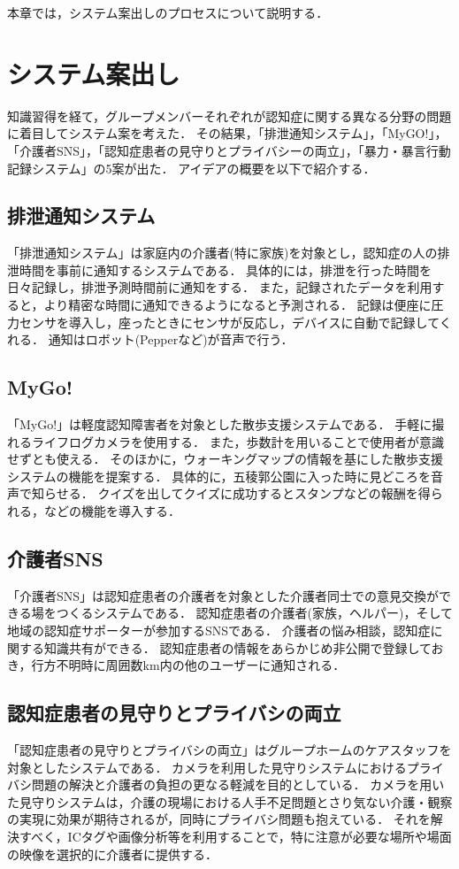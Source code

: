 \documentclass[../report]{subfiles}
\begin{document}
本章では，システム案出しのプロセスについて説明する．


\section{システム案出し} \label{sec:4_anndashi}
知識習得を経て，グループメンバーそれぞれが認知症に関する異なる分野の問題に着目してシステム案を考えた．
その結果，「排泄通知システム」，「MyGO!」，「介護者SNS」，「認知症患者の見守りとプライバシーの両立」，「暴力・暴言行動記録システム」の5案が出た．
アイデアの概要を以下で紹介する．

\subsection{排泄通知システム}
「排泄通知システム」は家庭内の介護者(特に家族)を対象とし，認知症の人の排泄時間を事前に通知するシステムである．
具体的には，排泄を行った時間を日々記録し，排泄予測時間前に通知をする．
また，記録されたデータを利用すると，より精密な時間に通知できるようになると予測される．
記録は便座に圧力センサを導入し，座ったときにセンサが反応し，デバイスに自動で記録してくれる．
通知はロボット(Pepperなど)が音声で行う．

\subsection{MyGo!}
「MyGo!」は軽度認知障害者を対象とした散歩支援システムである．
手軽に撮れるライフログカメラを使用する．
また，歩数計を用いることで使用者が意識せずとも使える．
そのほかに，ウォーキングマップの情報を基にした散歩支援システムの機能を提案する．
具体的に，五稜郭公園に入った時に見どころを音声で知らせる．
クイズを出してクイズに成功するとスタンプなどの報酬を得られる，などの機能を導入する．

\subsection{介護者SNS}
「介護者SNS」は認知症患者の介護者を対象とした介護者同士での意見交換ができる場をつくるシステムである．
認知症患者の介護者(家族，ヘルパー)，そして地域の認知症サポーターが参加するSNSである．
介護者の悩み相談，認知症に関する知識共有ができる．
認知症患者の情報をあらかじめ非公開で登録しておき，行方不明時に周囲数km内の他のユーザーに通知される．

\subsection{認知症患者の見守りとプライバシの両立}
「認知症患者の見守りとプライバシの両立」はグループホームのケアスタッフを対象としたシステムである．
カメラを利用した見守りシステムにおけるプライバシ問題の解決と介護者の負担の更なる軽減を目的としている．
カメラを用いた見守りシステムは，介護の現場における人手不足問題とさり気ない介護・観察の実現に効果が期待されるが，同時にプライバシ問題も抱えている．
それを解決すべく，ICタグや画像分析等を利用することで，特に注意が必要な場所や場面の映像を選択的に介護者に提供する．
\end{document}

